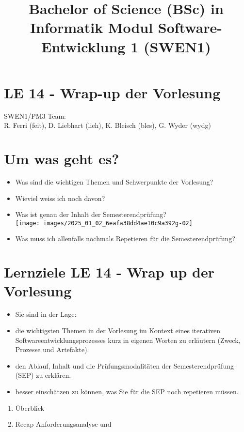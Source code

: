 \documentclass[10pt]{article}
\title{Bachelor of Science (BSc) in Informatik Modul Software-Entwicklung 1 (SWEN1) }
\author{}
\date{}
\begin{document}
\maketitle
\section*{LE 14 - Wrap-up der Vorlesung}
SWEN1/PM3 Team:\\
R. Ferri (feit), D. Liebhart (lieh), K. Bleisch (bles), G. Wyder (wydg)

\section*{Um was geht es?}
\begin{itemize}
  \item Was sind die wichtigen Themen und Schwerpunkte der Vorlesung?
  \item Wieviel weiss ich noch davon?
  \item Was ist genau der Inhalt der Semesterendprüfung?\\
\texttt{[image: images/2025\_01\_02\_6eafa38dd4ae10c9a392g-02]}
  \item Was muss ich allenfalls nochmals Repetieren für die Semesterendprüfung?
\end{itemize}

\section*{Lernziele LE 14 - Wrap up der Vorlesung}
\begin{itemize}
  \item Sie sind in der Lage:
  \item die wichtigsten Themen in der Vorlesung im Kontext eines iterativen Softwareentwicklungsprozesses kurz in eigenen Worten zu erläutern (Zweck, Prozesse und Artefakte).
  \item den Ablauf, Inhalt und die Prüfungsmodalitäten der Semesterendprüfung (SEP) zu erklären.
  \item besser einschätzen zu können, was Sie für die SEP noch repetieren müssen.
\end{itemize}

\begin{enumerate}
  \item Überblick
  \item Recap Anforderungsanalyse und
\end{enumerate}
\end{document}
